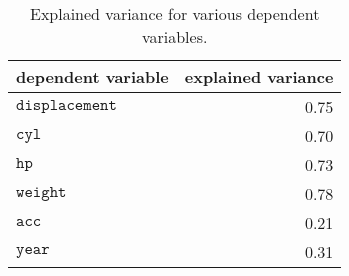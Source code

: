 \begin{table}
  \centering
  \begin{tabular}{|l|r|}
  \hline
  dependent variable      & explained variance   \\
  \hline
  \hline
  $\mathtt{displacement}$ & 0.75                 \\
  \hline
  $\mathtt{cyl}$          & 0.70                 \\
  \hline
  $\mathtt{hp}$           & 0.73                 \\
  \hline
  $\mathtt{weight}$       & 0.78                 \\
  \hline
  $\mathtt{acc}$          & 0.21                 \\
  \hline
  $\mathtt{year}$         & 0.31                 \\
  \hline
  \end{tabular}
  \caption[explained variance]{Explained variance for various dependent variables.}
  \label{tab:explained-variance}
\end{table}


